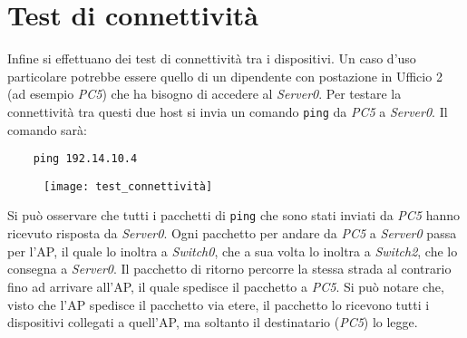 \section{Test di connettività}
\hspace{24pt}Infine si effettuano dei test di connettività tra i dispositivi. Un caso d'uso particolare potrebbe essere quello di un dipendente con postazione in Ufficio 2 (ad esempio \textit{PC5}) che ha bisogno di accedere al \textit{Server0}. Per testare la connettività tra questi due host si invia un comando \texttt{ping} da \textit{PC5} a \textit{Server0}. Il comando sarà:
\begin{verbatim}
	ping 192.14.10.4
\end{verbatim}
\begin{figure}[!h]
	\texttt{[image: test\_connettività]}
	\label{fig:tc1}
\end{figure}
\hspace{24pt}Si può osservare che tutti i pacchetti di \texttt{ping} che sono stati inviati da \textit{PC5} hanno ricevuto risposta da \textit{Server0}. Ogni pacchetto per andare da \textit{PC5} a \textit{Server0} passa per l'AP, il quale lo inoltra a \textit{Switch0}, che a sua volta lo inoltra a \textit{Switch2}, che lo consegna a \textit{Server0}. Il pacchetto di ritorno percorre la stessa strada al contrario fino ad arrivare all'AP, il quale spedisce il pacchetto a \textit{PC5}. Si può notare che, visto che l'AP spedisce il pacchetto via etere, il pacchetto lo ricevono tutti i dispositivi collegati a quell'AP, ma soltanto il destinatario (\textit{PC5}) lo legge.